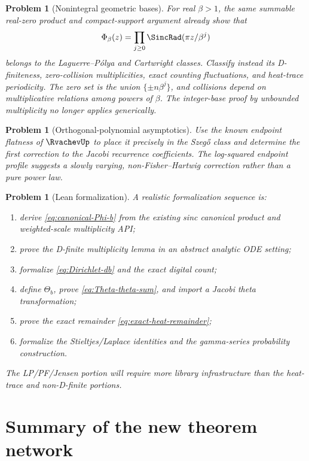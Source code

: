 \documentclass[11pt]{article}
\newtheorem{problem}[theorem]{Problem}
\theoremstyle{definition}
\theoremstyle{remark}
\begin{document}
\begin{problem}[Nonintegral geometric bases]
For real \(\beta>1\), the same summable real-zero product and compact-support argument already show that
\[
 \Phi_\beta(z)=\prod_{j\ge0}\SincRad(\pi z/\beta^j)
\]
belongs to the Laguerre--P\'olya and Cartwright classes.  Classify instead its D-finiteness, zero-collision multiplicities, exact counting fluctuations, and heat-trace periodicity.  The zero set is the union \(\{\pm n\beta^j\}\), and collisions depend on multiplicative relations among powers of \(\beta\).  The integer-base proof by unbounded multiplicity no longer applies generically.
\end{problem}

\begin{problem}[Orthogonal-polynomial asymptotics]
Use the known endpoint flatness of \(\RvachevUp\) to place it precisely in the Szeg\H{o} class and determine the first correction to the Jacobi recurrence coefficients.  The log-squared endpoint profile suggests a slowly varying, non-Fisher--Hartwig correction rather than a pure power law.
\end{problem}

\begin{problem}[Lean formalization]
A realistic formalization sequence is:
\begin{enumerate}[leftmargin=2em]
  \item derive \eqref{eq:canonical-Phi-b} from the existing sinc canonical product and weighted-scale multiplicity API;
  \item prove the D-finite multiplicity lemma in an abstract analytic ODE setting;
  \item formalize \eqref{eq:Dirichlet-db} and the exact digital count;
  \item define \(\Theta_b\), prove \eqref{eq:Theta-theta-sum}, and import a Jacobi theta transformation;
  \item prove the exact remainder \eqref{eq:exact-heat-remainder};
  \item formalize the Stieltjes/Laplace identities and the gamma-series probability construction.
\end{enumerate}
The LP/PF/Jensen portion will require more library infrastructure than the heat-trace and non-D-finite portions.
\end{problem}

\section{Summary of the new theorem network}
\end{document}
